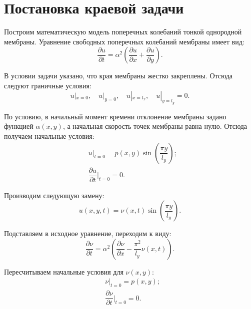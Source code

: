 \section{Постановка краевой задачи}
{

Построим математическую модель поперечных колебаний тонкой однородной мембраны.
Уравнение свободных поперечных колебаний мембраны имеет вид:
    \begin{equation}\label{source_func}
      \dfrac{\partial u}{\partial t} = \alpha^2(
      \dfrac{\partial u}{\partial x} + 
      \dfrac{\partial u}{\partial y}).
    \end{equation}

В условии задачи указано, что края мембраны жестко закреплены. Отсюда
    следуют граничные условия:
    \begin{equation}
    u|_{x=0}, \quad
    u|_{y=0},  \quad
    u|_{x=l_x}, \quad
    u|_{y=l_y} = 0.
    \end{equation}
    
По условию, в начальный момент времени отклонение мембраны задано функцией $\alpha(x, y)$, а начальная скорость точек мембраны равна нулю. Отсюда получаем начальные условия:
    \begin{align*}
        &  u|_{t=0} = p(x,y)\sin(\dfrac{\pi y}{l_y});\\        
        & \dfrac{\partial u}{\partial t}|_{t=0} = 0.
    \end{align*}
    
Производим следующую замену:
     \begin{equation}\label{change}
    	u(x,y,t) = \nu(x,t)\sin (\dfrac{\pi y}{l_y}).
    \end{equation}    
    
Подставляем в исходное уравнение, переходим к виду:
    \begin{equation}
         \dfrac{\partial \nu}{\partial t} = \alpha^2(\dfrac{\partial \nu}{\partial x}
        - \dfrac{\pi^2}{l_y}\nu(x, t)).
    \end{equation}
    
    Пересчитываем начальные условия для $\nu(x,y)$:
     \begin{align*}
        &  \nu|_{t=0} = p(x,y);\\        
        & \dfrac{\partial \nu}{\partial t}|_{t=0} = 0.
    \end{align*}
    
}
